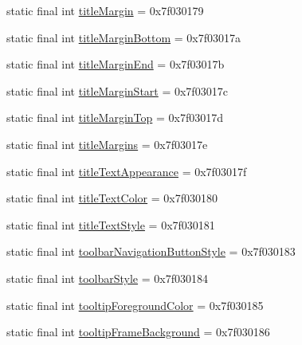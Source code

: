 \begin{DoxyCompactItemize}
\item 
static final int \mbox{\hyperlink{classandroid_1_1support_1_1v7_1_1appcompat_1_1R_1_1attr_a166c6c95d482bb92ed6a1f88b311dd71}{title\+Margin}} = 0x7f030179
\item 
static final int \mbox{\hyperlink{classandroid_1_1support_1_1v7_1_1appcompat_1_1R_1_1attr_ad13d5190bf6d91b5f44074745bf45600}{title\+Margin\+Bottom}} = 0x7f03017a
\item 
static final int \mbox{\hyperlink{classandroid_1_1support_1_1v7_1_1appcompat_1_1R_1_1attr_ad5c63c69274a686ad0cca3dab4ed6543}{title\+Margin\+End}} = 0x7f03017b
\item 
static final int \mbox{\hyperlink{classandroid_1_1support_1_1v7_1_1appcompat_1_1R_1_1attr_abfe08e41a25653a3a8b8d789b56a092f}{title\+Margin\+Start}} = 0x7f03017c
\item 
static final int \mbox{\hyperlink{classandroid_1_1support_1_1v7_1_1appcompat_1_1R_1_1attr_aa93444276547b6992aaafc06f0318594}{title\+Margin\+Top}} = 0x7f03017d
\item 
static final int \mbox{\hyperlink{classandroid_1_1support_1_1v7_1_1appcompat_1_1R_1_1attr_af20050b093f0fbae9f5caeac8e1f5a5e}{title\+Margins}} = 0x7f03017e
\item 
static final int \mbox{\hyperlink{classandroid_1_1support_1_1v7_1_1appcompat_1_1R_1_1attr_af30268dd35d59987ae331965f3e4b27f}{title\+Text\+Appearance}} = 0x7f03017f
\item 
static final int \mbox{\hyperlink{classandroid_1_1support_1_1v7_1_1appcompat_1_1R_1_1attr_af7f5689d219b8641d6c75b7701d5966e}{title\+Text\+Color}} = 0x7f030180
\item 
static final int \mbox{\hyperlink{classandroid_1_1support_1_1v7_1_1appcompat_1_1R_1_1attr_ade279724823bddd614405995b4faf136}{title\+Text\+Style}} = 0x7f030181
\item 
static final int \mbox{\hyperlink{classandroid_1_1support_1_1v7_1_1appcompat_1_1R_1_1attr_a47d1ceaaf7373d5f8472dfffbeec86b7}{toolbar\+Navigation\+Button\+Style}} = 0x7f030183
\item 
static final int \mbox{\hyperlink{classandroid_1_1support_1_1v7_1_1appcompat_1_1R_1_1attr_a06381c6ce2a53989bf4629cd4d250d3a}{toolbar\+Style}} = 0x7f030184
\item 
static final int \mbox{\hyperlink{classandroid_1_1support_1_1v7_1_1appcompat_1_1R_1_1attr_ac0f3eee2a0c876e03b40cbde51a9a728}{tooltip\+Foreground\+Color}} = 0x7f030185
\item 
static final int \mbox{\hyperlink{classandroid_1_1support_1_1v7_1_1appcompat_1_1R_1_1attr_ab06eb6f844f0d30989f01fed152749df}{tooltip\+Frame\+Background}} = 0x7f030186

\end{DoxyCompactItemize}
